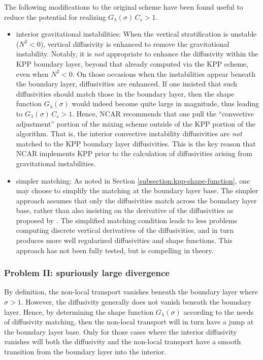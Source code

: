 The following modifications to the original \cite{LargeKPP} scheme
have been found useful to reduce the potential for realizing
$G_{\lambda}(\sigma) \, C_{s} > 1$.
\begin{itemize}

\item {\sc interior gravitational instabilities}: When the vertical
  stratification is unstable ($N^{2} < 0$), vertical diffusivity is
  enhanced to remove the gravitational instability. Notably, it is
  {\it not} appropriate to enhance the diffusivity within the KPP
  boundary layer, beyond that already computed via the KPP scheme,
  even when $N^{2} < 0$.  On those occasions when the instabilities
  appear beneath the boundary layer, diffusivities are enhanced.  If
  one insisted that such diffusivities should match those in the
  boundary layer, then the shape function $G_{\lambda}(\sigma)$ would
  indeed become quite large in magnitude, thus leading to $
  G_{\lambda}(\sigma) \, C_{s} > 1$.  Hence, NCAR recommends that one
  pull the ``convective adjustment'' portion of the mixing scheme
  outside of the KPP portion of the algorithm.  That is, the interior
  convective instability diffusivities are {\it not} matched to the
  KPP boundary layer diffusivities.  This is the key reason that NCAR
  implements KPP prior to the calculation of diffusivities arising
  from gravitational instabilities.

\item {\sc simpler matching}: As noted in Section
  \ref{subsection:kpp-shape-function}, one may choose to simplify the
  matching at the boundary layer base.  The simpler approach assumes
  that only the diffusivities match across the boundary layer base,
  rather than also insisting on the derivative of the diffusivities as
  proposed by \cite{LargeKPP}.  The simplified matching condition
  leads to less problems computing discrete vertical derivatives of
  the diffusivities, and in turn produces more well regularized
  diffusivities and shape functions.  This approach has not been fully
  tested, but is compelling in theory.

\end{itemize}


\subsubsection{Problem II: spuriously large divergence}

By definition, the non-local transport vanishes beneath the boundary
layer where $\sigma >1$.  However, the diffusivity generally does not
vanish beneath the boundary layer.  Hence, by determining the shape
function $G_{\lambda}(\sigma)$ according to the needs of diffusivity
matching, then the non-local transport will in turn have a jump at the
boundary layer base.  Only for those cases where the interior
diffusivity vanishes will both the diffusivity and the non-local
transport have a smooth transition from the boundary layer into the
interior.

